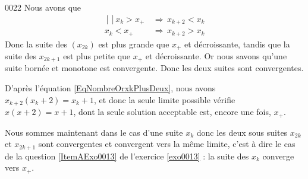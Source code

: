 \begin{corrige}{0022}
Nous avons que 
\begin{equation}
	\begin{aligned}[]
		x_k>x_+\,&\Rightarrow\,x_{k+2}<x_k\\
		x_k<x_+\,&\Rightarrow\,x_{k+2}>x_k
	\end{aligned}
\end{equation}
Donc la suite des $(x_{2k})$ est plus grande que $x_+$ et décroissante, tandis que la suite des $x_{2k+1}$ est plus petite que $x_+$ et décroissante. Or nous savons qu'une suite bornée et monotone est convergente. Donc les deux suites sont convergentes.

D'après l'équation \eqref{EqNombreOrxkPlusDeux}, nous avons $x_{k+2}(x_k+2)=x_k+1$, et donc la seule limite possible vérifie $x(x+2)=x+1$, dont la seule solution acceptable est, encore une fois, $x_+$.

Nous sommes maintenant dans le cas d'une suite $x_k$ donc les deux sous suites $x_{2k}$ et $x_{2k+1}$ sont convergentes et convergent vers la même limite, c'est à dire le cas de la question \ref{ItemAExo0013} de l'exercice \ref{exo0013} : la suite des $x_k$ converge vers $x_+$.

\end{corrige}

